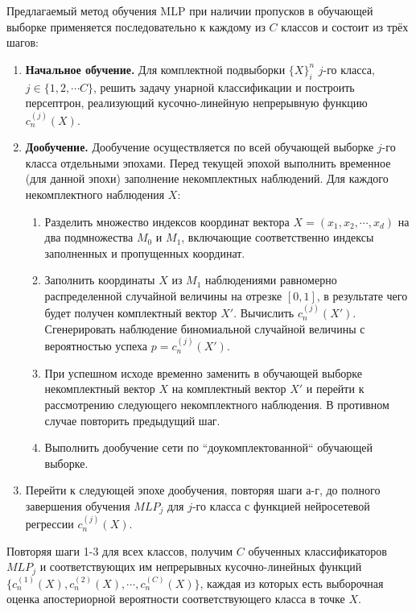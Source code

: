 Предлагаемый метод обучения MLP при наличии пропусков в обучающей выборке применяется последовательно к каждому из \(C\) классов и состоит из трёх шагов:

\begin{enumerate}
    \item \textbf{Начальное обучение.} Для комплектной подвыборки \(\{X\}_i^n\) \(j\)-го класса, \(j \in \{1, 2, \cdots C\}\), решить задачу унарной классификации и построить персептрон, реализующий кусочно-линейную непрерывную функцию \(c_n^{(j)}(X)\).
    
    \item \textbf{Дообучение.} Дообучение  осуществляется по всей обучающей выборке \(j\)-го класса отдельными эпохами. Перед текущей эпохой выполнить временное (для данной эпохи) заполнение некомплектных наблюдений. Для каждого некомплектного наблюдения \(X\):

    \begin{enumerate}
        \item Разделить множество индексов координат вектора \(X=(x_1, x_2, \cdots, x_d)\) на два подмножества \(M_0\) и \(M_1\), включающие соответственно индексы заполненных и пропущенных координат. 
        
        \item Заполнить координаты \(X\) из \(M_1\) наблюдениями равномерно распределенной случайной величины на отрезке \([0, 1]\), в результате чего будет получен комплектный вектор \(X'\). Вычислить \(c_n^{(j)}(X')\). Сгенерировать наблюдение биномиальной случайной величины с вероятностью успеха \(p=c_n^{(j)}(X')\).
        
        \item При успешном исходе временно заменить в обучающей выборке некомплектный вектор \(X\) на комплектный вектор \(X'\) и перейти к рассмотрению следующего некомплектного наблюдения. В противном случае повторить предыдущий шаг.
        
        \item Выполнить дообучение сети по ``доукомплектованной`` обучающей выборке.
    \end{enumerate}
    
    \item Перейти к следующей эпохе дообучения, повторяя шаги а-г, до полного завершения обучения \(MLP_j\) для \(j\)-го класса с функцией нейросетевой регрессии \(c_n^{(j)}(X)\).
\end{enumerate}

Повторяя шаги 1-3 для всех классов, получим \(C\) обученных классификаторов \(MLP_j\) и соответствующих им непрерывных кусочно-линейных функций \(\{c_n^{(1)}(X), c_n^{(2)}(X), \cdots, c_n^{(C)}(X)\}\), каждая из которых есть выборочная оценка апостериорной вероятности соответствующего класса в точке \(X\).


